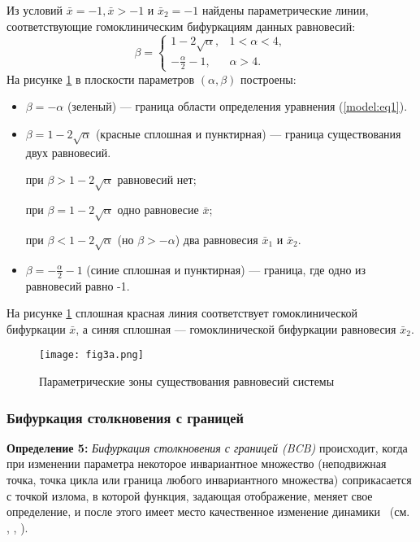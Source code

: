 \documentclass[a4paper, 14pt]{extreport}
\numberwithin{equation}{section}
\numberwithin{figure}{section}
\numberwithin{table}{section}
\begin{document}
			Из условий $ \bar{x} = -1, \bar{x} > -1 $ и $ \bar{x}_{2} = -1 $ найдены параметрические линии, соответствующие гомоклиническим бифуркациям данных равновесий:
			\begin{equation}
				\beta =
				\begin{cases}
					1 - 2 \sqrt{\alpha}, & 1 < \alpha < 4, \\[3mm]
					-\frac{\alpha}{2} - 1, & \alpha > 4.
				\end{cases}
			\end{equation} %
			На рисунке \ref{fig3a} в плоскости параметров $ (\alpha, \beta) $ построены:
			\begin{itemize}
				\item $ \beta = -\alpha $ (зеленый) --- граница области определения уравнения (\ref{model:eq1}).
				\item $ \beta = 1 - 2 \sqrt{\alpha} $ (красные сплошная и пунктирная) --- граница существования двух равновесий. %

				при $ \beta > 1 - 2 \sqrt{\alpha} $ равновесий нет; %
				
				при $ \beta = 1 - 2 \sqrt{\alpha} $ одно равновесие $ \bar{x} $; %
				
				при $ \beta < 1 - 2 \sqrt{\alpha} $ (но $ \beta > -\alpha $) два равновесия $ \bar{x}_{1} $ и $ \bar{x}_{2} $.
				\item $ \beta = -\frac{\alpha}{2} - 1 $ (синие сплошная и пунктирная) --- граница, где одно из равновесий равно -1.
			\end{itemize}
			На рисунке \ref{fig3a} сплошная красная линия соответствует гомоклинической бифуркации $ \bar{x} $, а синяя сплошная --- гомоклинической бифуркации равновесия $ \bar{x}_{2} $. %
			\begin{figure}[h!]
				\begin{center}
					\texttt{[image: fig3a.png]}
				\end{center}
				\caption{Параметрические зоны существования равновесий системы}
				\label{fig3a}		
			\end{figure} %
		\subsubsection{Бифуркация столкновения с границей}
		\label{bc_bif}
			{\bf Определение 5:} {\it Бифуркация столкновения с границей (BCB)} происходит, когда при изменении параметра некоторое инвариантное множество (неподвижная точка, точка цикла или граница любого инвариантного множества) соприкасается с точкой излома, в которой функция, задающая отображение, меняет свое определение, и после этого имеет место качественное изменение динамики~\cite{GardiniTramontanaSushko2010} (см. \cite{Nusse1992}, \cite{Nusse1995}, \cite{SushkoGardiniAvrutin2016}). %
\end{document}
